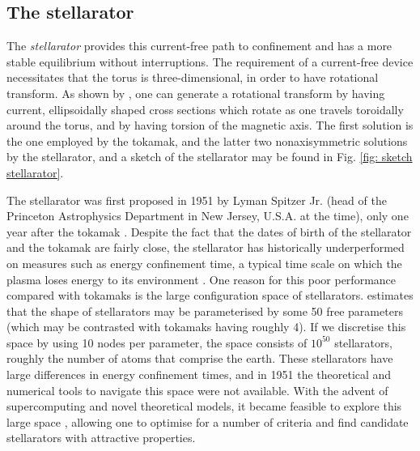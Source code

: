 \subsection{The stellarator}
The \textit{stellarator} provides this current-free path to confinement and has a more stable equilibrium without interruptions. The requirement of a current-free device necessitates that the torus is three-dimensional, in order to have rotational transform. As shown by \citet{mercier1964equilibrium}, one can generate a rotational transform by having current, ellipsoidally shaped cross sections which rotate as one travels toroidally around the torus, and by having torsion of the magnetic axis. The first solution is the one employed by the tokamak, and the latter two nonaxisymmetric solutions by the stellarator, and a sketch of the stellarator may be found in Fig. \ref{fig: sketch stellarator}. \par

The stellarator was first proposed in 1951 by Lyman Spitzer Jr. (head of the Princeton Astrophysics Department in New Jersey, U.S.A. at the time), only one year after the tokamak \cite{spitzer1951project}. Despite the fact that the dates of birth of the stellarator and the tokamak are fairly close, the stellarator has historically underperformed on measures such as energy confinement time, a typical time scale on which the plasma loses energy to its environment \cite{sudo1990scalings,stroth1996energy,sunn2017key}. One reason for this poor performance compared with tokamaks is the large configuration space of stellarators. \citet{boozer2005physics} estimates that the shape of stellarators may be parameterised by some 50 free parameters (which may be contrasted with tokamaks having roughly 4). If we discretise this space by using 10 nodes per parameter, the space consists of $10^{50}$ stellarators, roughly the number of atoms that comprise the earth. These stellarators have large differences in energy confinement times, and in 1951 the theoretical and numerical tools to navigate this space were not available. With the advent of supercomputing and novel theoretical models, it became feasible to explore this large space \cite{catto1981omnigenous,boozer1983transport,beidler1990physics,grieger1992physics,grieger1992modular,nuhrenberg1995overview}, allowing one to optimise for a number of criteria and find candidate stellarators with attractive properties. \par


